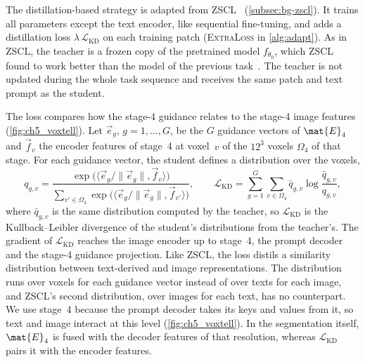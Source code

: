 The distillation-based strategy is adapted from ZSCL~\cite{zheng2023preventingzeroshottransferdegradation} (\cref{subsec:bg-zscl}).
It trains all parameters except the text encoder, like sequential fine-tuning, and adds a distillation loss $\lambda\,\mathcal{L}_{\mathrm{KD}}$ on each training patch (\textsc{ExtraLoss} in \cref{alg:adapt}).
As in ZSCL, the teacher is a frozen copy of the pretrained model $f_{\theta_0}$, which ZSCL found to work better than the model of the previous task~\cite[Table~1d]{zheng2023preventingzeroshottransferdegradation}.
The teacher is not updated during the whole task sequence and receives the same patch and text prompt as the student.

The loss compares how the stage-4 guidance relates to the stage-4 image features (\cref{fig:ch5_voxtell}).
Let $\vec{e}_g$, $g = 1, \dots, G$, be the $G$ guidance vectors of $\mat{E}_4$ and $\vec{f}_v$ the encoder features of stage~4 at voxel~$v$ of the $12^3$ voxels $\Omega_4$ of that stage.
For each guidance vector, the student defines a distribution over the voxels,
\begin{equation}
q_{g,v} = \frac{\exp\big(\langle \vec{e}_g / \|\vec{e}_g\|, \vec{f}_v \rangle\big)}{\sum_{v' \in \Omega_4} \exp\big(\langle \vec{e}_g / \|\vec{e}_g\|, \vec{f}_{v'} \rangle\big)},
\qquad
\mathcal{L}_{\mathrm{KD}} = \sum_{g=1}^{G} \sum_{v \in \Omega_4} \bar{q}_{g,v} \log \frac{\bar{q}_{g,v}}{q_{g,v}},
\label{eq:method-kd}
\end{equation}
where $\bar{q}_{g,v}$ is the same distribution computed by the teacher, so $\mathcal{L}_{\mathrm{KD}}$ is the Kullback--Leibler divergence of the student's distributions from the teacher's.
The gradient of $\mathcal{L}_{\mathrm{KD}}$ reaches the image encoder up to stage~4, the prompt decoder and the stage-4 guidance projection.
Like ZSCL, the loss distils a similarity distribution between text-derived and image representations.
The distribution runs over voxels for each guidance vector instead of over texts for each image, and ZSCL's second distribution, over images for each text, has no counterpart.
We use stage~4 because the prompt decoder takes its keys and values from it, so text and image interact at this level (\cref{fig:ch5_voxtell}).
In the segmentation itself, $\mat{E}_4$ is fused with the decoder features of that resolution, whereas $\mathcal{L}_{\mathrm{KD}}$ pairs it with the encoder features.

\begin{table}[tb]
\centering
\caption[Overview of the strategies]{Steps of \cref{alg:adapt} in which the six strategies differ. The column ``Added in training'' lists what a strategy adds to the training of sequential fine-tuning: extra training data ($\textsc{ExtraData}_{\mathcal{S}}$), an extra loss term ($\textsc{ExtraLoss}_{\mathcal{S}}$) or a gradient factor $\xi_{\mathcal{S},t} \neq 1$. The parentheses give the number of trained parameters.  gives the number of parameters that sequential fine-tuning and the distillation-based strategy can update.}
\label{tab:method-strategies}

\end{table}

